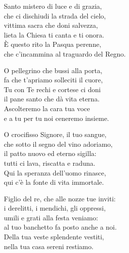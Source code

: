 
\strofa Santo mistero di luce e di grazia,\\
che ci dischiudi la strada del cielo,\\
vittima sacra che doni salvezza,\\
lieta la Chiesa ti canta e ti onora.\\
È questo rito la Pasqua perenne,\\
che c'incammina al traguardo del Regno.

\spazio


\spazio

\strofa O pellegrino che bussi alla porta,\\
fa che t'apriamo solleciti il cuore,\\
Tu con Te rechi e cortese ci doni\\
il pane santo che dà vita eterna.\\
Ascolteremo la cara tua voce\\
e a tu per tu noi ceneremo insieme.

\spazio


\spazio

\strofa O crocifisso Signore, il tuo sangue,\\
che sotto il segno del vino adoriamo,\\
il patto nuovo ed eterno sigilla:\\
tutti ci lava, riscatta e raduna.\\
Qui la speranza dell'uomo rinasce,\\
qui c'è la fonte di vita immortale.

\spazio


\spazio

\strofa Figlio del re, che alle nozze tue inviti:\\
i derelitti, i mendichi, gli oppressi,\\
umili e grati alla festa veniamo:\\
al tuo banchetto fa posto anche a noi.\\
Della tua veste splendente vestiti,\\
nella tua casa sereni restiamo.

